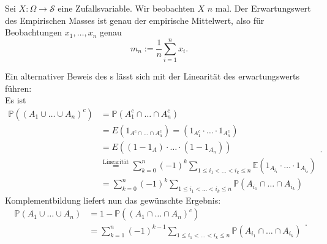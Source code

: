 \begin{remark}
    Sei $X:\Omega\to \mathcal{S}$ eine Zufallsvariable. Wir beobachten $X$  $n$ mal. Der Erwartungswert des Empirischen Masses ist genau der empirische Mittelwert, also für Beobachtungen $x_1,\ldots,x_n$ genau
    \[
    m_n := \frac{1}{n} \sum_{i=1}^n x_i
    .\] 
\end{remark}
\begin{example}[Anwendung]
    Ein alternativer Beweis des s lässt sich mit der Linearität des erwartungswerts führen:\\
Es ist
\[
    \begin{split}
    \mathbb{P}((A_1 \cup \ldots\cup A_n)^{c}) &= \mathbb{P}(A_1^{c}\cap \ldots\cap A_n^{c}) \\
                                              &= E(1_{A^{c}\cap \ldots\cap A_n^{c}}) = (1_{A_1^{c}}\cdot \ldots\cdot 1_{A_n^{c}}) \\
                                              &= E((1-1_A)\cdot \ldots\cdot (1-1_{A_n})) \\
                                              &\stackrel{\text{Linearität}}{=} \sum_{k=0}^n (-1)^k \sum_{1\leq i_1<\ldots<i_k\leq n} \mathbb{E}(1_{A_{i_1}}\cdot \ldots\cdot 1_{A_{i_k}}) \\
                                              &=\sum_{k=0}^n (-1)^k \sum_{1\leq i_1<\ldots<i_k\leq n}\mathbb{P}(A_{i_1}\cap \ldots\cap A_{i_k})
    \end{split}
.\] 
Komplementbildung liefert nun das gewünschte Ergebnis:
\[
    \begin{split}
    \mathbb{P}(A_1\cup \ldots\cup A_n) &= 1-\mathbb{P}((A_1\cap \ldots\cap A_n)^{c}) \\
                                       &= \sum_{k=1}^n (-1)^{k-1} \sum_{1\leq i_1<\ldots<i_k\leq n} \mathbb{P}(A_{i_1}\cap \ldots\cap A_{i_k})
    \end{split}
.\] 
\end{example}
